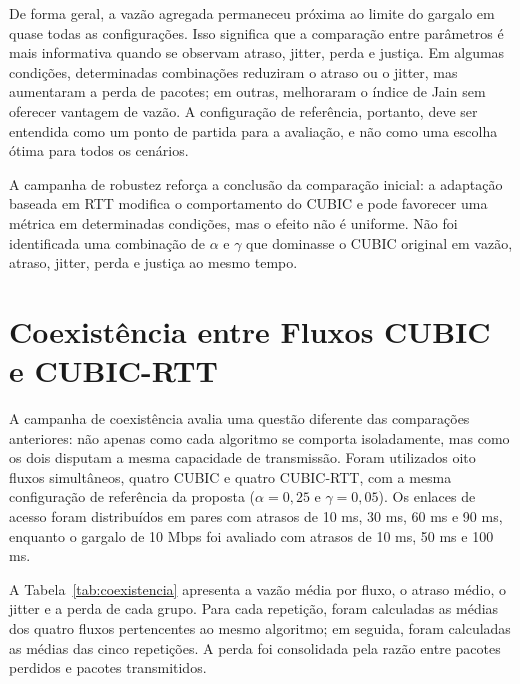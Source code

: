 De forma geral, a vazão agregada permaneceu próxima ao limite do gargalo em quase todas as configurações. Isso significa que a comparação entre parâmetros é mais informativa quando se observam atraso, jitter, perda e justiça. Em algumas condições, determinadas combinações reduziram o atraso ou o jitter, mas aumentaram a perda de pacotes; em outras, melhoraram o índice de Jain sem oferecer vantagem de vazão. A configuração de referência, portanto, deve ser entendida como um ponto de partida para a avaliação, e não como uma escolha ótima para todos os cenários.

A campanha de robustez reforça a conclusão da comparação inicial: a adaptação baseada em RTT modifica o comportamento do CUBIC e pode favorecer uma métrica em determinadas condições, mas o efeito não é uniforme. Não foi identificada uma combinação de $\alpha$ e $\gamma$ que dominasse o CUBIC original em vazão, atraso, jitter, perda e justiça ao mesmo tempo.

\section{Coexistência entre Fluxos CUBIC e CUBIC-RTT}

A campanha de coexistência avalia uma questão diferente das comparações anteriores: não apenas como cada algoritmo se comporta isoladamente, mas como os dois disputam a mesma capacidade de transmissão. Foram utilizados oito fluxos simultâneos, quatro CUBIC e quatro CUBIC-RTT, com a mesma configuração de referência da proposta ($\alpha=0{,}25$ e $\gamma=0{,}05$). Os enlaces de acesso foram distribuídos em pares com atrasos de 10 ms, 30 ms, 60 ms e 90 ms, enquanto o gargalo de 10 Mbps foi avaliado com atrasos de 10 ms, 50 ms e 100 ms.

A Tabela~\ref{tab:coexistencia} apresenta a vazão média por fluxo, o atraso médio, o jitter e a perda de cada grupo. Para cada repetição, foram calculadas as médias dos quatro fluxos pertencentes ao mesmo algoritmo; em seguida, foram calculadas as médias das cinco repetições. A perda foi consolidada pela razão entre pacotes perdidos e pacotes transmitidos.

